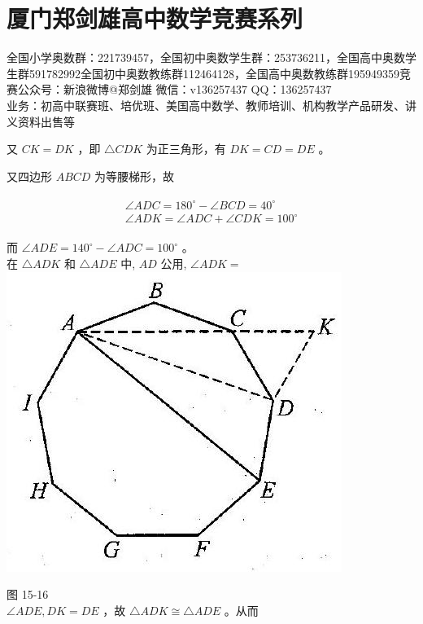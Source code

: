 \documentclass[10pt]{article}
\begin{document}
\section*{厦门郑剑雄高中数学竞赛系列}
全国小学奥数群：221739457，全国初中奥数学生群：253736211，全国高中奥数学生群591782992全国初中奥数教练群112464128，全国高中奥数教练群195949359竞赛公众号：新浪微博@郑剑雄 微信：v136257437 QQ：136257437\\
业务：初高中联赛班、培优班、美国高中数学、教师培训、机构教学产品研发、讲义资料出售等

又 $C K=D K$ ，即 $\triangle C D K$ 为正三角形，有 $D K=C D=D E$ 。

又四边形 $A B C D$ 为等腰梯形，故

\begin{align*}
\begin{gathered}
\angle A D C=180^{\circ}-\angle B C D=40^{\circ} \\
\angle A D K=\angle A D C+\angle C D K=100^{\circ}
\end{gathered}
\end{align*}

而 $\angle A D E=140^{\circ}-\angle A D C=100^{\circ}$ 。\\
在 $\triangle A D K$ 和 $\triangle A D E$ 中, $A D$ 公用, $\angle A D K=$\\
\includegraphics[max width=\textwidth, center]{2024_10_30_2c8f45efd4a519b08e1ag-144(1)}

图 15-16\\
$\angle A D E, D K=D E$ ，故 $\triangle A D K \cong \triangle A D E$ 。从而
\end{document}
